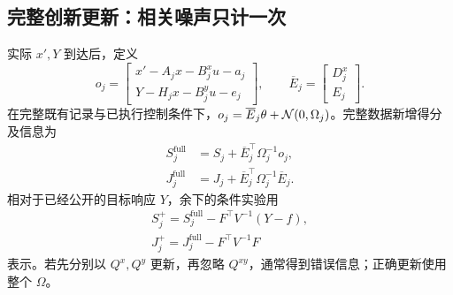 \documentclass[UTF8,fontset=fandol,11pt,a4paper]{ctexart}
\theoremstyle{definition}\newtheorem{definition}[theorem]{定义}\newtheorem{assumption}[theorem]{条件}
\numberwithin{equation}{section}
\begin{document}
\subsection{完整创新更新：相关噪声只计一次}
实际 $x',Y$ 到达后，定义
\begin{equation}
o_j=\begin{bmatrix}
x'-A_jx-B_j^xu-a_j\\Y-H_jx-B_j^yu-e_j
\end{bmatrix},\qquad
\overline E_j=\begin{bmatrix}D_j^x\\E_j\end{bmatrix}.
\end{equation}
在完整既有记录与已执行控制条件下，$o_j=\overline E_j\theta+\mathcal N(0,\Omega_j)$。完整数据新增得分及信息为
\begin{align}
S_j^{\mathrm{full}}&=S_j+\overline E_j^\top\Omega_j^{-1}o_j,\\
J_j^{\mathrm{full}}&=J_j+\overline E_j^\top\Omega_j^{-1}\overline E_j.
\end{align}
相对于已经公开的目标响应 $Y$，余下的条件实验用
\begin{align}
\boxed{S_j^+=S_j^{\mathrm{full}}-F^\top V^{-1}(Y-f),}\label{eq:stateSupdate}\\
\boxed{J_j^+=J_j^{\mathrm{full}}-F^\top V^{-1}F}\label{eq:stateJupdate}
\end{align}
表示。若先分别以 $Q^x,Q^y$ 更新，再忽略 $Q^{xy}$，通常得到错误信息；正确更新使用整个 $\Omega$。
\end{document}
